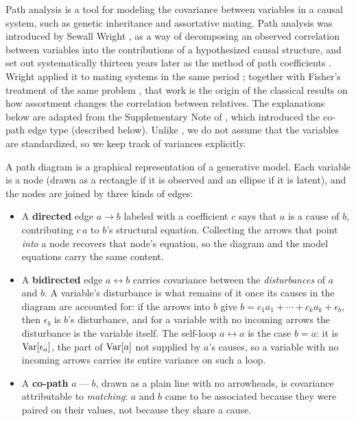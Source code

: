 \documentclass[12pt]{article}
\numberwithin{equation}{section}
\begin{document}
Path analysis is a tool for modeling the covariance between variables in a causal system, such as genetic inheritance and assortative mating.
Path analysis was introduced by Sewall Wright \citep{Wright1921JAgricRes}, as a way of decomposing an observed correlation between variables into the contributions of a hypothesized causal structure, and set out systematically thirteen years later as the method of path coefficients \citep{Wright1934AnnMathStat}.
Wright applied it to mating systems in the same period \citep{Wright1921GeneticsMatingI, Wright1921GeneticsMatingIII}; together with Fisher's treatment of the same problem \citep{Fisher1918TransRoySocEdin}, that work is the origin of the classical results on how assortment changes the correlation between relatives.
The explanations below are adapted from the Supplementary Note of \citet{Sunde2025NatComm}, which introduced the co-path edge type (described below).
Unlike \citet{Sunde2025NatComm}, we do not assume that the variables are standardized, so we keep track of variances explicitly.

A path diagram is a graphical representation of a generative model.
Each variable is a node (drawn as a rectangle if it is observed and an ellipse if it is latent), and the nodes are joined by three kinds of edges:

\begin{itemize}
    \item A \textbf{directed} edge $a \rightarrow b$ labeled with a coefficient $c$ says that $a$ is a cause of $b$, contributing $c\,a$ to $b$'s structural equation.
    Collecting the arrows that point \emph{into} a node recovers that node's equation, so the diagram and the model equations carry the same content.
    \item A \textbf{bidirected} edge $a \leftrightarrow b$ carries covariance between the \emph{disturbances} of $a$ and $b$.
    A variable's disturbance is what remains of it once its causes in the diagram are accounted for: if the arrows into $b$ give $b = c_1 a_1 + \cdots + c_k a_k + \epsilon_b$, then $\epsilon_b$ is $b$'s disturbance, and for a variable with no incoming arrows the disturbance is the variable itself.
    The self-loop $a \leftrightarrow a$ is the case $b=a$: it is $\mathrm{Var}[\epsilon_a]$, the part of $\mathrm{Var}[a]$ not supplied by $a$'s causes, so a variable with no incoming arrows carries its entire variance on such a loop.
    \item A \textbf{co-path} $a \;\text{---}\; b$, drawn as a plain line with no arrowheads, is covariance attributable to \emph{matching}: $a$ and $b$ came to be associated because they were paired on their values, not because they share a cause.
\end{itemize}
\end{document}
